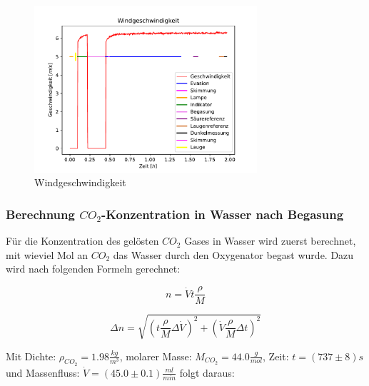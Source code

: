 \documentclass[12pt]{article}
\begin{document}
\begin{figure}[H]
	\centering
	\parbox{82.5mm}{
		\centering
		\includegraphics[width=82.5mm]{Meerwasser/Windgeschwindigkeit}
		\caption{Windgeschwindigkeit}
	}
	\hfill%
	\parbox{82.5mm}{
		\centering
	}
\end{figure}


\subsubsection{Berechnung $CO_2$-Konzentration in Wasser nach Begasung}

Für die Konzentration des gelösten $CO_2$ Gases in Wasser wird zuerst berechnet, mit wieviel Mol an $CO_2$ das Wasser durch den Oxygenator begast wurde. Dazu wird nach folgenden Formeln gerechnet:

\begin{equation}
n = \dot V t \frac{\rho}{M}
\end{equation}

\begin{equation}
\Delta n = \sqrt{(t \frac{\rho}{M} \Delta \dot V)^{2}+(\dot V \frac{\rho}{M} \Delta t)^{2}}
\end{equation}

Mit Dichte: $\rho_{CO_2} = 1.98 \frac{kg}{m^3} $, molarer Masse: $M_{CO_2} = 44.0\frac{g}{mol} $, Zeit:  $t = (737 \pm 8)s$ und Massenfluss: $\dot V = (45.0 \pm 0.1)\frac{ml}{min}$ folgt daraus:
\end{document}
